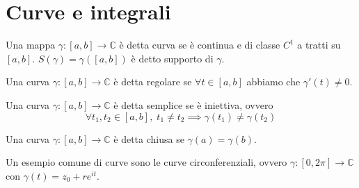 \section{Curve e integrali}
        \begin{definition}
            Una mappa $\gamma: [a, b] \rightarrow \mathbb{C}$ è detta curva se è continua e di classe $C^{1}$ a tratti su $[a, b]$.
            $S(\gamma) = \gamma([a, b])$ è detto supporto di $\gamma$.
        \end{definition}

        \begin{definition}
            Una curva $\gamma: [a, b] \rightarrow \mathbb{C}$ è detta regolare se $\forall t \in [a, b]$ abbiamo che $\gamma'(t) \neq 0$.
        \end{definition}

        \begin{definition}
            Una curva $\gamma: [a, b] \rightarrow \mathbb{C}$ è detta semplice se è iniettiva, ovvero
            \[
                \forall t_{1}, t_{2} \in [a, b], \; t_{1} \neq t_{2} \implies \gamma(t_{1}) \neq \gamma(t_{2})
            \]
        \end{definition}

        \begin{definition}
            Una curva $\gamma: [a, b] \rightarrow \mathbb{C}$ è detta chiusa se $\gamma(a) = \gamma(b)$.
        \end{definition}

        Un esempio comune di curve sono le curve circonferenziali, ovvero $\gamma: [0, 2\pi] \rightarrow \mathbb{C}$ con $\gamma(t) = z_{0} + re^{it}$.

